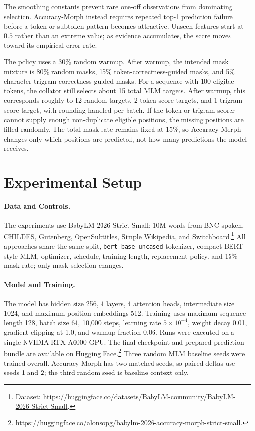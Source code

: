 \documentclass[11pt]{article}
\begin{document}
The smoothing constants prevent rare one-off observations from dominating selection.
Accuracy-Morph instead requires repeated top-1 prediction failure before a token or subtoken pattern becomes attractive.
Unseen features start at $0.5$ rather than an extreme value; as evidence accumulates, the score moves toward its empirical error rate.

The policy uses a 30\% random warmup.
After warmup, the intended mask mixture is 80\% random masks, 15\% token-correctness-guided masks, and 5\% character-trigram-correctness-guided masks.
For a sequence with 100 eligible tokens, the collator still selects about 15 total MLM targets.
After warmup, this corresponds roughly to 12 random targets, 2 token-score targets, and 1 trigram-score target, with rounding handled per batch.
If the token or trigram scorer cannot supply enough non-duplicate eligible positions, the missing positions are filled randomly.
The total mask rate remains fixed at 15\%, so Accuracy-Morph changes only which positions are predicted, not how many predictions the model receives.

\section{Experimental Setup}

\paragraph{Data and Controls.}
The experiments use BabyLM 2026 Strict-Small: 10M words from BNC spoken, CHILDES, Gutenberg, OpenSubtitles, Simple Wikipedia, and Switchboard.\footnote{Dataset: \url{https://huggingface.co/datasets/BabyLM-community/BabyLM-2026-Strict-Small}.}
All approaches share the same split, \texttt{bert-base-uncased} tokenizer, compact BERT-style MLM, optimizer, schedule, training length, replacement policy, and 15\% mask rate; only mask selection changes.

\paragraph{Model and Training.}
The model has hidden size 256, 4 layers, 4 attention heads, intermediate size 1024, and maximum position embeddings 512.
Training uses maximum sequence length 128, batch size 64, 10{,}000 steps, learning rate $5 \times 10^{-4}$, weight decay 0.01, gradient clipping at 1.0, and warmup fraction 0.06.
Runs were executed on a single NVIDIA RTX A6000 GPU.
The final checkpoint and prepared prediction bundle are available on Hugging Face.\footnote{\url{https://huggingface.co/alonsopg/babylm-2026-accuracy-morph-strict-small}.}
Three random MLM baseline seeds were trained overall.
Accuracy-Morph has two matched seeds, so paired deltas use seeds 1 and 2; the third random seed is baseline context only.
\end{document}
